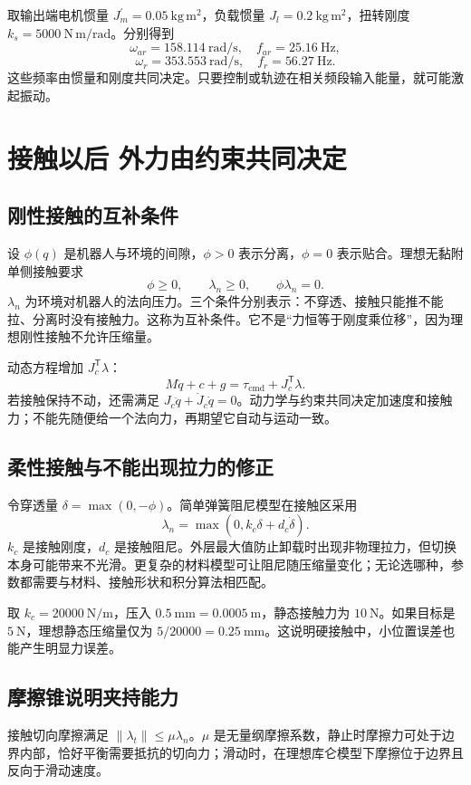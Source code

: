 取输出端电机惯量 $J_m^{\prime}=0.05\ \mathrm{kg\,m^2}$，负载惯量 $J_l=0.2\ \mathrm{kg\,m^2}$，扭转刚度 $k_s=5000\ \mathrm{N\,m/rad}$。分别得到
\[
 \omega_{ar}=158.114\ \mathrm{rad/s},\quad f_{ar}=25.16\ \mathrm{Hz},
\]
\[
 \omega_r=353.553\ \mathrm{rad/s},\quad f_r=56.27\ \mathrm{Hz}.
\]
这些频率由惯量和刚度共同决定。只要控制或轨迹在相关频段输入能量，就可能激起振动。

\section{接触以后 外力由约束共同决定}
\subsection{刚性接触的互补条件}
设 $\phi(q)$ 是机器人与环境的间隙，$\phi>0$ 表示分离，$\phi=0$ 表示贴合。理想无黏附单侧接触要求
\begin{equation}
 \phi\ge0,\qquad\lambda_n\ge0,\qquad\phi\lambda_n=0.
\end{equation}
$\lambda_n$ 为环境对机器人的法向压力。三个条件分别表示：不穿透、接触只能推不能拉、分离时没有接触力。这称为互补条件。它不是“力恒等于刚度乘位移”，因为理想刚性接触不允许压缩量。

动态方程增加 $J_c^{\mathsf T}\lambda$：
\[
 M\ddot q+c+g=\tau_{\mathrm{cmd}}+J_c^{\mathsf T}\lambda.
\]
若接触保持不动，还需满足 $J_c\ddot q+\dot J_c\dot q=0$。动力学与约束共同决定加速度和接触力；不能先随便给一个法向力，再期望它自动与运动一致。

\subsection{柔性接触与不能出现拉力的修正}
令穿透量 $\delta=\max(0,-\phi)$。简单弹簧阻尼模型在接触区采用
\[
 \lambda_n=\max(0,k_c\delta+d_c\dot\delta).
\]
$k_c$ 是接触刚度，$d_c$ 是接触阻尼。外层最大值防止卸载时出现非物理拉力，但切换本身可能带来不光滑。更复杂的材料模型可让阻尼随压缩量变化；无论选哪种，参数都需要与材料、接触形状和积分算法相匹配。

\begin{examplebox}[算例 7F 接触刚度决定很小位移对应多大力]
取 $k_c=20000\ \mathrm{N/m}$，压入 $0.5\ \mathrm{mm}=0.0005\ \mathrm m$，静态接触力为 $10\ \mathrm N$。如果目标是 $5\ \mathrm N$，理想静态压缩量仅为 $5/20000=0.25\ \mathrm{mm}$。这说明硬接触中，小位置误差也能产生明显力误差。
\end{examplebox}

\subsection{摩擦锥说明夹持能力}
接触切向摩擦满足 $\|\lambda_t\|\le\mu\lambda_n$。$\mu$ 是无量纲摩擦系数，静止时摩擦力可处于边界内部，恰好平衡需要抵抗的切向力；滑动时，在理想库仑模型下摩擦位于边界且反向于滑动速度。

